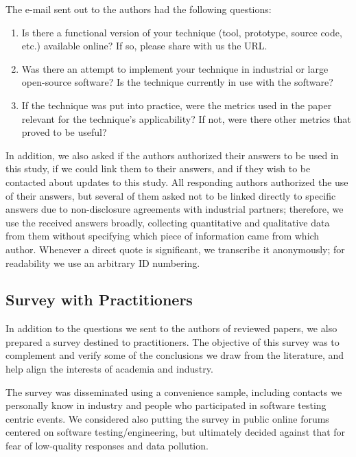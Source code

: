 The e-mail sent out to the authors had the following questions:

\begin{tcolorbox}%
\small
\begin{enumerate}
	\item  Is there a functional version of your technique (tool, prototype, source code, etc.) available online? If so, please share with us the URL.

	\item Was there an attempt to implement your technique in industrial or large open-source software? Is the technique currently in use with the software?

	\item If the technique was put into practice, were the metrics used in the paper relevant for the technique’s applicability? If not, were there other metrics that proved to be useful?
\end{enumerate}
\end{tcolorbox}

In addition, we also asked if the authors authorized their answers to be used in this study, if we could link them to their answers, and if they wish to be contacted about updates to this study.
All responding authors authorized the use of their answers, but several of them asked not to be linked directly to specific answers due to non-disclosure agreements with industrial partners; therefore, we use the received answers broadly, collecting quantitative and qualitative data from them without specifying which piece of information came from which author.
Whenever a direct quote is significant, we transcribe it anonymously; for readability we use an arbitrary ID numbering.

\subsection{Survey with Practitioners}
\label{subsec:prac_survey}

In addition to the questions we sent to the authors of reviewed papers, we also prepared a survey destined to practitioners.
The objective of this survey was to complement and verify some of the conclusions we draw from the literature, and help align the interests of academia and industry.

The survey was disseminated using a convenience sample, including contacts we personally know in industry and people who participated in software testing centric events.
We considered also putting the survey in public online forums centered on software testing/engineering, but ultimately decided against that for fear of low-quality responses and data pollution.

